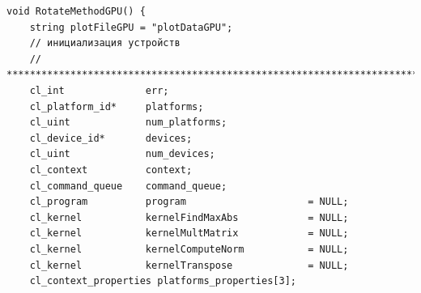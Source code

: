 \documentclass[utf8, 12pt, a4paper, oneside]{article}
\begin{document}
\begin{lstlisting}
void RotateMethodGPU() {
    string plotFileGPU = "plotDataGPU";
    // инициализация устройств
    // ************************************************************************************
    cl_int              err;
    cl_platform_id*     platforms;
    cl_uint             num_platforms;
    cl_device_id*       devices;
    cl_uint             num_devices;
    cl_context          context;
    cl_command_queue    command_queue;
    cl_program          program                     = NULL;
    cl_kernel           kernelFindMaxAbs            = NULL;
    cl_kernel           kernelMultMatrix            = NULL;
    cl_kernel           kernelComputeNorm           = NULL;
    cl_kernel           kernelTranspose             = NULL;
    cl_context_properties platforms_properties[3];


\end{lstlisting}
\end{document}
